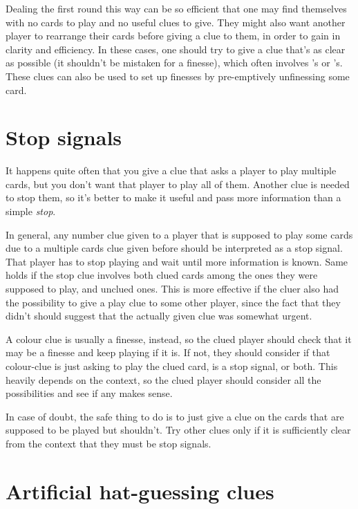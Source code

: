 \documentclass[a4paper]{article}
\theoremstyle{plain}
\theoremstyle{definition}
\begin{document}
Dealing the first round this way can be so efficient that one may find themselves with no cards to play and no useful clues to give. They might also want another player to rearrange their cards before giving a clue to them, in order to gain in clarity and efficiency. In these cases, one should try to give a clue that's as clear as possible (it shouldn't be mistaken for a finesse), which often involves 's or 's. These clues can also be used to set up finesses by pre-emptively unfinessing some card. 
                                                           
\section{Stop signals}
\label{stopsignals}

It happens quite often that you give a clue that asks a player to play multiple cards, but you don't want that player to play all of them. Another clue is needed to stop them, so it's better to make it useful and pass more information than a simple \textit{stop}.

In general, any number clue given to a player that is supposed to play some cards due to a multiple cards clue given before should be interpreted as a stop signal. That player has to stop playing and wait until more information is known. Same holds if the stop clue involves both clued cards among the ones they were supposed to play, and unclued ones. This is more effective if the cluer also had the possibility to give a play clue to some other player, since the fact that they didn't should suggest that the actually given clue was somewhat urgent.

A colour clue is usually a finesse, instead, so the clued player should check that it may be a finesse and keep playing if it is. If not, they should consider if that colour-clue is just asking to play the clued card, is a stop signal, or both. This heavily depends on the context, so the clued player should consider all the possibilities and see if any makes sense.

In case of doubt, the safe thing to do is to just give a clue on the cards that are supposed to be played but shouldn't. Try other clues only if it is sufficiently clear from the context that they must be stop signals.

\section{Artificial hat-guessing clues}
\label{sec:mod8}
\end{document}
